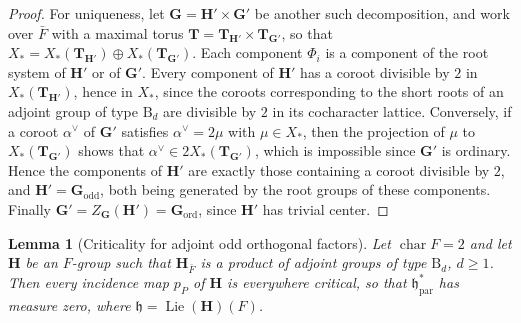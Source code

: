 \documentclass[11pt,reqno]{amsart}
\numberwithin{equation}{section}
\theoremstyle{plain}
\newtheorem{lemma}[theorem]{Lemma}
\theoremstyle{definition}
\theoremstyle{remark}
\theoremstyle{plain}
\newcommand{\bG}{\mathbf{G}}     %
\newcommand{\bT}{\mathbf{T}}     %
\newcommand{\bH}{\mathbf{H}}     %
\newcommand{\Godd}{\bG_{\mathrm{odd}}}
\newcommand{\Gord}{\bG_{\mathrm{ord}}}
\newcommand{\lieh}{\mathfrak{h}}  %
\newcommand{\Par}[2][]{#2_{#1\mathrm{par}}}
\DeclareMathOperator{\Lie}{Lie}
\DeclareMathOperator{\chr}{char}   %
\newcommand{\ordinary}{ordinary}
\begin{document}
\begin{proof}
For uniqueness, let $\bG=\bH'\times\bG'$ be another such decomposition,
and work over $\bar F$ with a maximal torus $\bT=\bT_{\bH'}\times\bT_{\bG'}$,
so that $X_*=X_*(\bT_{\bH'})\oplus X_*(\bT_{\bG'})$. Each component
$\Phi_i$ is a component of the root system of $\bH'$ or of $\bG'$. Every
component of $\bH'$ has a coroot divisible by $2$ in $X_*(\bT_{\bH'})$,
hence in $X_*$, since the coroots corresponding to the short roots of an adjoint group of type
$\mathrm B_d$ are divisible by $2$ in its cocharacter lattice. Conversely,
if a coroot $\alpha^\vee$ of $\bG'$ satisfies $\alpha^\vee=2\mu$ with
$\mu\in X_*$, then the projection of $\mu$ to $X_*(\bT_{\bG'})$ shows that
$\alpha^\vee\in2X_*(\bT_{\bG'})$, which is impossible since $\bG'$ is
\ordinary{}. Hence the components of $\bH'$ are exactly those
containing a coroot divisible by $2$, and $\bH'=\Godd$, both being
generated by the root groups of these components. Finally
$\bG'=Z_\bG(\bH')=\Gord$, since $\bH'$ has trivial center.
\end{proof}

\begin{lemma}[Criticality for adjoint odd orthogonal factors]\label{lem:oddorthogonal}
Let $\chr F=2$ and let $\bH$ be an $F$-group such that
$\bH_{\bar F}$ is a product of adjoint groups of type $\mathrm B_d$, $d\ge1$.
Then every incidence map $p_P$ of $\bH$ is everywhere critical, so that
$\Par{\lieh^*}$ has measure zero, where $\lieh=\Lie(\bH)(F)$.
\end{lemma}
\end{document}
